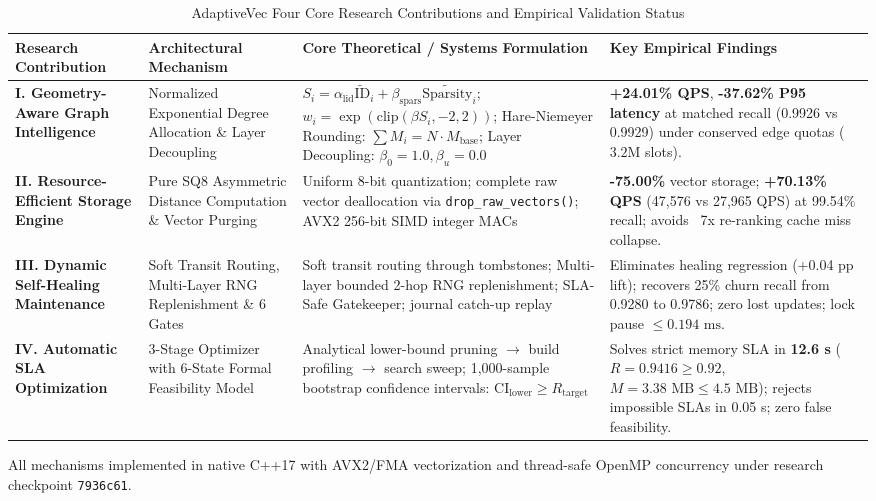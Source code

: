 \begin{table}[t]
\centering
\caption{AdaptiveVec Four Core Research Contributions and Empirical Validation Status}
\label{tab:four_contributions}
\begin{tabular}{p{3.2cm}p{3.8cm}p{5.5cm}p{4.2cm}}
\toprule
\textbf{Research Contribution} & \textbf{Architectural Mechanism} & \textbf{Core Theoretical / Systems Formulation} & \textbf{Key Empirical Findings} \\
\midrule
\textbf{I. Geometry-Aware Graph Intelligence} & Normalized Exponential Degree Allocation \& Layer Decoupling & $S_i = \alpha_{\text{lid}}\tilde{\text{ID}}_i + \beta_{\text{spars}}\tilde{\text{Sparsity}}_i$; $w_i = \exp(\text{clip}(\beta S_i, -2, 2))$; Hare-Niemeyer Rounding: $\sum M_i = N \cdot M_{\text{base}}$; Layer Decoupling: $\beta_0=1.0, \beta_u=0.0$ & \textbf{+24.01\% QPS}, \textbf{-37.62\% P95 latency} at matched recall (0.9926 vs 0.9929) under conserved edge quotas ($3.2\text{M}$ slots). \\
\midrule
\textbf{II. Resource-Efficient Storage Engine} & Pure SQ8 Asymmetric Distance Computation \& Vector Purging & Uniform 8-bit quantization; complete raw vector deallocation via \texttt{drop\_raw\_vectors()}; AVX2 256-bit SIMD integer MACs & \textbf{-75.00\%} vector storage; \textbf{+70.13\% QPS} (47,576 vs 27,965 QPS) at 99.54\% recall; avoids ~7x re-ranking cache miss collapse. \\
\midrule
\textbf{III. Dynamic Self-Healing Maintenance} & Soft Transit Routing, Multi-Layer RNG Replenishment \& 6 Gates & Soft transit routing through tombstones; Multi-layer bounded 2-hop RNG replenishment; SLA-Safe Gatekeeper; journal catch-up replay & Eliminates healing regression (+0.04 pp lift); recovers 25\% churn recall from 0.9280 to 0.9786; zero lost updates; lock pause $\le 0.194\text{ ms}$. \\
\midrule
\textbf{IV. Automatic SLA Optimization} & 3-Stage Optimizer with 6-State Formal Feasibility Model & Analytical lower-bound pruning $\to$ build profiling $\to$ search sweep; 1,000-sample bootstrap confidence intervals: $\text{CI}_{\text{lower}} \ge R_{\text{target}}$ & Solves strict memory SLA in \textbf{12.6 s} ($R=0.9416 \ge 0.92$, $M=3.38\text{ MB} \le 4.5\text{ MB}$); rejects impossible SLAs in 0.05 s; zero false feasibility. \\
\bottomrule
\end{tabular}
\vspace{1ex}
\raggedright
\footnotesize{All mechanisms implemented in native C++17 with AVX2/FMA vectorization and thread-safe OpenMP concurrency under research checkpoint \texttt{7936c61}.}
\end{table}
